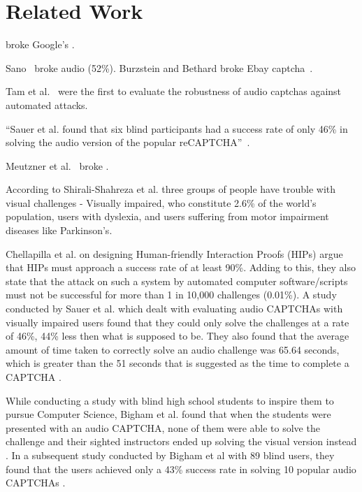 \section{Related Work}
\label{sec:related}

\cite{sivakorn:eurosp16} broke Google's \re.

Sano~\cite{Sano2013} broke audio  (52\%).
Burzstein and Bethard broke Ebay captcha~\cite{Bursztein2009}.

Tam et al.~\cite{tam2008improving} were the first to evaluate the robustness of audio captchas against automated attacks.

``Sauer et al. found that
six blind participants had a success rate of only 46\% in
solving the audio version of the popular reCAPTCHA''~\cite{sauer2008towards}.

Meutzner et al.~\cite{meutzner2014using} broke .

According to Shirali-Shahreza et al. \cite{shirali2011accessibility} three groups of people
have trouble with visual challenges - Visually impaired, who constitute 2.6\% of the world's
population, users with dyslexia, and users suffering from motor impairment diseases like Parkinson's.

Chellapilla et al. \cite{Chellapilla} on designing Human-friendly Interaction Proofs (HIPs)
argue that HIPs must approach a success rate of at least 90\%. Adding to this, they also state that the
attack on such a system by automated computer software/scripts must not be successful for more than 1 in
10,000 challenges (0.01\%). A study conducted by Sauer et al. \cite{sauer2008towards} which dealt with
evaluating audio CAPTCHAs with visually impaired users found that they could only solve the challenges
at a rate of 46\%, 44\% less then what is supposed to be. They also found that the average amount of time
taken to correctly solve an audio challenge was 65.64 seconds, which is greater than the 51 seconds that
is suggested as the time to complete a CAPTCHA \cite{schluessler2007bot}.

While conducting a study with blind high school students to inspire them to pursue Computer Science, Bigham et al.
found that when the students were presented with an audio CAPTCHA, none of them were able to solve the challenge and
their sighted instructors ended up solving the visual version instead \cite{bigham2008inspiring}. In a subsequent
study conducted by Bigham et al with 89 blind users, they found that the users achieved only a 43\% success rate in
solving 10 popular audio CAPTCHAs \cite{bigham2009evaluating}. 

